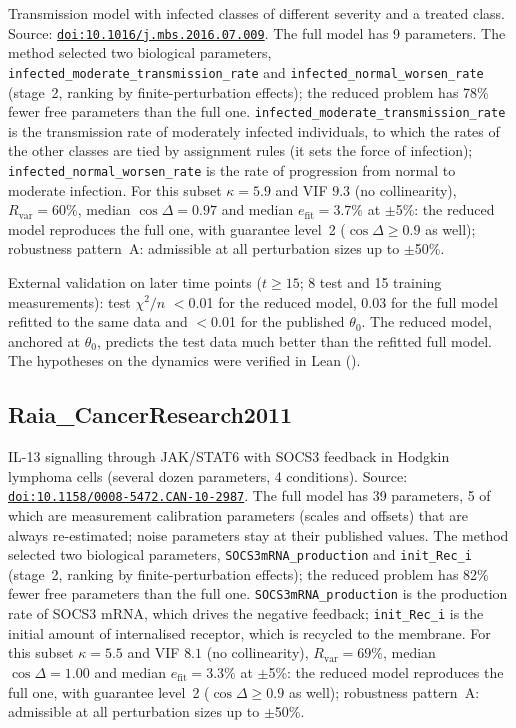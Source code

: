 Transmission model with infected classes of different severity and a treated class. Source: \href{https://doi.org/10.1016/j.mbs.2016.07.009}{\nolinkurl{doi:10.1016/j.mbs.2016.07.009}}. The full model has 9 parameters. The method selected two biological parameters, \texttt{infected\_moderate\_transmission\_rate} and \texttt{infected\_normal\_worsen\_rate} (stage~2, ranking by finite-perturbation effects); the reduced problem has 78\% fewer free parameters than the full one. \texttt{infected\_moderate\_transmission\_rate} is the transmission rate of moderately infected individuals, to which the rates of the other classes are tied by assignment rules (it sets the force of infection); \texttt{infected\_normal\_worsen\_rate} is the rate of progression from normal to moderate infection. For this subset $\kappa=5.9$ and VIF $9.3$ (no collinearity), $R_{\mathrm{var}}=60\%$, median $\cos\Delta=0.97$ and median $e_{\mathrm{fit}}=3.7\%$ at $\pm$5\%: the reduced model reproduces the full one, with guarantee level~2 ($\cos\Delta\ge0.9$ as well); robustness pattern~A: admissible at all perturbation sizes up to $\pm$50\%.

External validation on later time points ($t\ge15$; 8 test and 15 training measurements): test $\chi^2/n$ $<$0.01 for the reduced model, 0.03 for the full model refitted to the same data and $<$0.01 for the published $\theta_0$. The reduced model, anchored at $\theta_0$, predicts the test data much better than the refitted full model. The hypotheses on the dynamics were verified in Lean ().

\subsection*{Raia\_CancerResearch2011}

IL-13 signalling through JAK/STAT6 with SOCS3 feedback in Hodgkin lymphoma cells (several dozen parameters, 4 conditions). Source: \href{https://doi.org/10.1158/0008-5472.CAN-10-2987}{\nolinkurl{doi:10.1158/0008-5472.CAN-10-2987}}. The full model has 39 parameters, 5 of which are measurement calibration parameters (scales and offsets) that are always re-estimated; noise parameters stay at their published values. The method selected two biological parameters, \texttt{SOCS3mRNA\_production} and \texttt{init\_Rec\_i} (stage~2, ranking by finite-perturbation effects); the reduced problem has 82\% fewer free parameters than the full one. \texttt{SOCS3mRNA\_production} is the production rate of SOCS3 mRNA, which drives the negative feedback; \texttt{init\_Rec\_i} is the initial amount of internalised receptor, which is recycled to the membrane. For this subset $\kappa=5.5$ and VIF $8.1$ (no collinearity), $R_{\mathrm{var}}=69\%$, median $\cos\Delta=1.00$ and median $e_{\mathrm{fit}}=3.3\%$ at $\pm$5\%: the reduced model reproduces the full one, with guarantee level~2 ($\cos\Delta\ge0.9$ as well); robustness pattern~A: admissible at all perturbation sizes up to $\pm$50\%.

